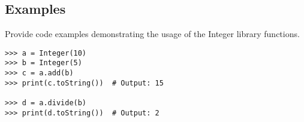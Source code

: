 
\subsection{Examples}

Provide code examples demonstrating the usage of the Integer library functions. 

\begin{verbatim}
>>> a = Integer(10)
>>> b = Integer(5)
>>> c = a.add(b)
>>> print(c.toString())  # Output: 15

>>> d = a.divide(b)
>>> print(d.toString())  # Output: 2
\end{verbatim}